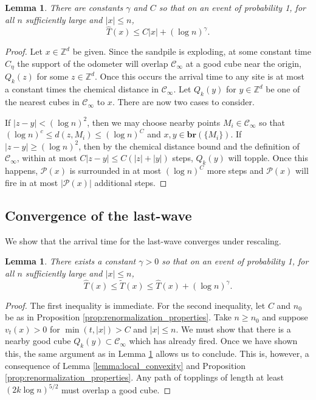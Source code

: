 \documentclass[aap]{imsart}
\newcommand{\Z}{\mathbb{Z}}
\newcommand{\br}{\mathbf{br}}  %
\newtheorem{lemma}[theorem]{Lemma}
\begin{document}
\begin{lemma} \label{lemma:penultimate_upper_bound}
	There are constants $\gamma$ and $C$ so that on an event of probability 1, for all $n$ sufficiently large and $|x| \leq n$, 
	\[
	\hat{T}(x) \leq  C |x| +  (\log n)^{\gamma} .
	\]
\end{lemma}
\begin{proof}
	Let $x \in \Z^d$ be given. Since the sandpile is exploding, at some constant time $C_\eta$
	the support of the odometer will overlap $\mathcal{C}_{\infty}$ at a good cube near the origin, $Q_k(z)$ for some $z \in \Z^d$. Once this occurs the arrival time to any site is at most a constant times the chemical distance in $\mathcal{C}_{\infty}$. Let $Q_k(y)$ for $y \in \Z^d$ be one of the nearest cubes in $\mathcal{C}_{\infty}$ to $x$.  There are now two cases to consider.
	
	
	If $|z-y| < (\log n)^2$, then we may choose nearby points $M_{i} \in \mathcal{C}_{\infty}$ so that $(\log n)^{c} \leq d(z,M_i) \leq (\log n)^C$ and $x,y \in \br(\{M_i\})$. 
	If $|z-y| \geq (\log n)^2$, then by the chemical distance bound and the definition of $\mathcal{C}_{\infty}$, 
	within at most $C |z-y| \leq C(|z| + |y|)$ steps, $Q_k(y)$ will topple. 
	Once this happens, $\mathcal{P}(x)$ is surrounded in at most $(\log n)^C$ more steps and $\mathcal{P}(x)$ will fire in at most $|\mathcal{P}(x)|$ additional steps.
	
\end{proof}





\subsection{Convergence of the last-wave}
We show that the arrival time for the last-wave converges under rescaling. 

\begin{lemma} \label{lemma:last_penultimate_close}
	There exists a constant $\gamma > 0$ so that on an event of probability 1, for all $n$ sufficiently large and $|x| \leq n$,
	\[
	\hat{T}(x) \leq \tilde{T}(x) \leq \hat{T}(x) + (\log n)^{\gamma}.
	\]
\end{lemma}
\begin{proof}
	The first inequality is immediate.  For the second inequality, let $C$ and $n_0$ be as in Proposition \ref{prop:renormalization_properties}.
	Take $n \geq n_0$ and suppose $v_t(x) > 0$ for $\min(t, |x|) > C$ and $|x| \leq n$.  We must show that there is a nearby good cube $Q_k(y) \subset \mathcal{C}_{\infty}$
	which has already fired. Once we have shown this, the same argument as in Lemma \ref{lemma:penultimate_upper_bound}
	allows us to conclude. 	This is, however, a consequence of Lemma \ref{lemma:local_convexity} and Proposition \ref{prop:renormalization_properties}. Any path of topplings of length at least $( 2k \log n)^{5/2}$ must overlap a good cube. 
\end{proof}
\end{document}
